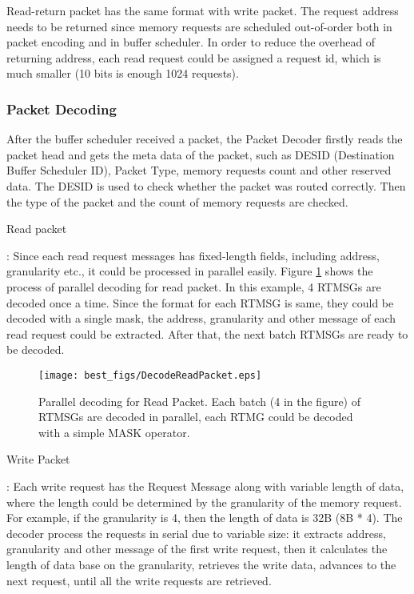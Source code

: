 \documentclass[pageno]{jpaper}
\begin{document}
Read-return packet has the same format with write packet. The request address needs to be returned since memory requests are scheduled out-of-order both in packet encoding and in buffer scheduler. In order to reduce the overhead of returning address, each read request could be assigned a request id, which is much smaller (10 bits is enough 1024 requests).

\subsubsection {Packet Decoding}

After the buffer scheduler received a packet, the Packet Decoder firstly reads the packet head and gets the meta data of the packet, such as DESID (Destination Buffer Scheduler ID), Packet Type, memory requests count and other reserved data. The DESID is used to check whether the packet was routed correctly. Then  the type of the packet and the count of memory requests are checked.

\begin{bfseries}Read packet\end{bfseries}: Since each read request messages has fixed-length fields, including address, granularity etc., it could be processed in parallel easily. Figure \ref{DecodeReadPacket} shows the process of parallel decoding for read packet. In this example, 4 RTMSGs are decoded once a time. Since the format for each RTMSG is same, they could be decoded with a single mask,  the address, granularity and other message of each read request could be extracted. After that, the next batch RTMSGs are ready to be decoded.

\begin{figure}
  \centering
  \texttt{[image: best\_figs/DecodeReadPacket.eps]}
  \caption{Parallel decoding for Read Packet. Each batch (4 in the figure) of RTMSGs are decoded in parallel, each RTMG could be decoded with a simple MASK operator.}
  \label{DecodeReadPacket}
\end{figure}

\begin{bfseries}Write Packet\end{bfseries}: Each write request has the Request Message along with variable length of data, where the length could be determined by the granularity of the memory request. For example, if the granularity is 4, then the length of data is 32B (8B * 4). The decoder process the requests in serial due to variable size: it extracts address, granularity and other message of the first write request, then it calculates the length of data base on the granularity, retrieves the write data, advances to the next request, until all the write requests are retrieved.
\end{document}
